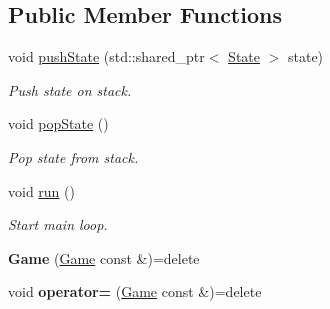 \subsection*{Public Member Functions}
\begin{DoxyCompactItemize}
\item 
\hypertarget{classGame_ade1d35f91a6fe6b6da70d7caebd174f6}{void \hyperlink{classGame_ade1d35f91a6fe6b6da70d7caebd174f6}{push\-State} (std\-::shared\-\_\-ptr$<$ \hyperlink{classState}{State} $>$ state)}\label{classGame_ade1d35f91a6fe6b6da70d7caebd174f6}

\begin{DoxyCompactList}\small\item\em Push state on stack. \end{DoxyCompactList}\item 
\hypertarget{classGame_a4b33dd67adef59bebadba8a234282c88}{void \hyperlink{classGame_a4b33dd67adef59bebadba8a234282c88}{pop\-State} ()}\label{classGame_a4b33dd67adef59bebadba8a234282c88}

\begin{DoxyCompactList}\small\item\em Pop state from stack. \end{DoxyCompactList}\item 
\hypertarget{classGame_a1ab78f5ed0d5ea879157357cf2fb2afa}{void \hyperlink{classGame_a1ab78f5ed0d5ea879157357cf2fb2afa}{run} ()}\label{classGame_a1ab78f5ed0d5ea879157357cf2fb2afa}

\begin{DoxyCompactList}\small\item\em Start main loop. \end{DoxyCompactList}\item 
\hypertarget{classGame_a586a831ed5ff1283fcf1b96f4eff065c}{{\bfseries Game} (\hyperlink{classGame}{Game} const \&)=delete}\label{classGame_a586a831ed5ff1283fcf1b96f4eff065c}

\item 
\hypertarget{classGame_aa4c0eacd8656e54ec4e94877c453e531}{void {\bfseries operator=} (\hyperlink{classGame}{Game} const \&)=delete}\label{classGame_aa4c0eacd8656e54ec4e94877c453e531}

\end{DoxyCompactItemize}

